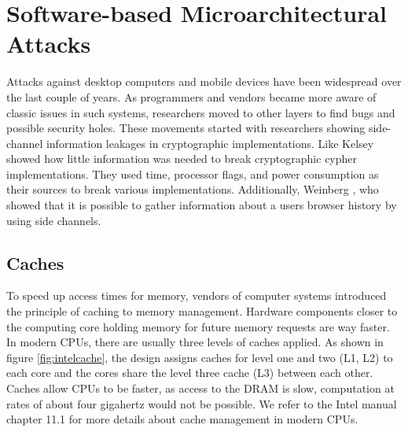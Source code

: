 
\section{Software-based Microarchitectural Attacks}

Attacks against desktop computers and mobile devices have been widespread over
the last couple of years. As programmers and vendors became more aware of
classic issues in such systems, researchers moved to other layers to find bugs
and possible security holes. These movements started with researchers showing
side-channel information leakages in cryptographic implementations. Like
Kelsey \etal\cite{kelsey1998side} showed how little information was needed
to break cryptographic cypher implementations. They used time, processor flags,
and power consumption as their sources to break various implementations.
Additionally, Weinberg \etal\cite{weinberg2011still}, who showed that it is
possible to gather information about a users browser history by using side
channels.

\subsection{Caches}

To speed up access times for memory, vendors of computer systems introduced the
principle of caching to memory management. Hardware components closer to the
computing core holding memory for future memory requests are way faster. In
modern CPUs, there are usually three levels of caches applied. As shown in
figure \ref{fig:intelcache}, the design assigns caches for level one and two
(L1, L2) to each core and the cores share the level three cache (L3) between
each other. Caches allow CPUs to be faster, as access to the DRAM is slow,
computation at rates of about four gigahertz would not be possible. We refer to
the Intel manual~\cite{intelsys} chapter 11.1 for more details about cache
management in modern CPUs.

